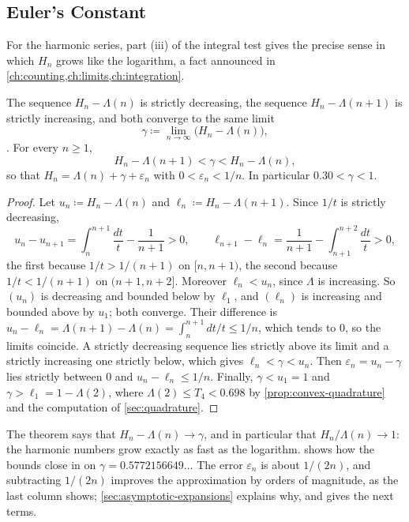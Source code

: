 \subsection{Euler's Constant}

For the harmonic series, part (iii) of the integral test gives the precise sense in which $H_n$ grows like the logarithm, a fact announced in \cref{ch:counting,ch:limits,ch:integration}.

\begin{theorem}
\label{thm:euler-constant}
The sequence $H_n-\Lambda(n)$ is strictly decreasing, the sequence $H_n-\Lambda(n+1)$ is strictly increasing, and both converge to the same limit
\[
\gamma\coloneqq\lim_{n\to\infty}\bigl(H_n-\Lambda(n)\bigr),
\]
. For every $n\ge1$,
\[
H_n-\Lambda(n+1)<\gamma<H_n-\Lambda(n),
\]
so that $H_n=\Lambda(n)+\gamma+\varepsilon_n$ with $0<\varepsilon_n<1/n$.
In particular $0.30<\gamma<1$.
\end{theorem}

\begin{proof}
Let $u_n\coloneqq H_n-\Lambda(n)$ and $\ell_n\coloneqq H_n-\Lambda(n+1)$. Since $1/t$ is strictly decreasing,
\[
u_n-u_{n+1}=\int_n^{n+1}\frac{dt}t-\frac1{n+1}>0,\qquad\ell_{n+1}-\ell_n=\frac1{n+1}-\int_{n+1}^{n+2}\frac{dt}t>0 ,
\]
the first because $1/t>1/(n+1)$ on $[n,n+1)$, the second because $1/t<1/(n+1)$ on $(n+1,n+2]$. Moreover $\ell_n<u_n$, since $\Lambda$ is increasing. So $(u_n)$ is decreasing and bounded below by $\ell_1$, and $(\ell_n)$ is increasing and bounded above by $u_1$; both converge. Their difference is $u_n-\ell_n=\Lambda(n+1)-\Lambda(n)=\int_n^{n+1}dt/t\le1/n$, which tends to $0$, so the limits coincide. A strictly decreasing sequence lies strictly above its limit and a strictly increasing one strictly below, which gives $\ell_n<\gamma<u_n$. Then $\varepsilon_n=u_n-\gamma$ lies strictly between $0$ and $u_n-\ell_n\le1/n$. Finally, $\gamma<u_1=1$ and $\gamma>\ell_1=1-\Lambda(2)$, where $\Lambda(2)\le T_4<0.698$ by \cref{prop:convex-quadrature} and the computation of \cref{sec:quadrature}.
\end{proof}

The theorem says that $H_n-\Lambda(n)\to\gamma$, and in particular that $H_n/\Lambda(n)\to1$: the harmonic numbers grow exactly as fast as the logarithm.  shows how the bounds close in on $\gamma=0.5772156649\ldots$ The error $\varepsilon_n$ is about $1/(2n)$, and subtracting $1/(2n)$ improves the approximation by orders of magnitude, as the last column shows; \cref{sec:asymptotic-expansions} explains why, and gives the next terms.

